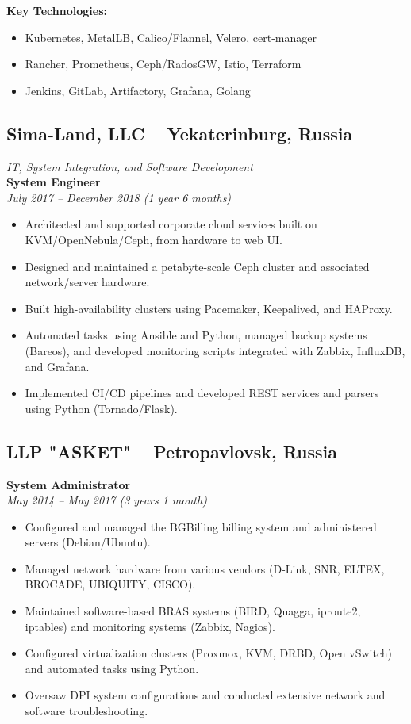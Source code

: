 \documentclass[12pt,a4paper]{article}
\begin{document}
\textbf{Key Technologies:}
\begin{itemize}
    \item Kubernetes, MetalLB, Calico/Flannel, Velero, cert-manager
    \item Rancher, Prometheus, Ceph/RadosGW, Istio, Terraform
    \item Jenkins, GitLab, Artifactory, Grafana, Golang
\end{itemize}

\subsection*{Sima-Land, LLC – Yekaterinburg, Russia}
\textit{IT, System Integration, and Software Development}\\
\textbf{System Engineer}\\
\textit{July 2017 – December 2018 (1 year 6 months)}
\begin{itemize}
    \item Architected and supported corporate cloud services built on KVM/OpenNebula/Ceph, from hardware to web UI.
    \item Designed and maintained a petabyte-scale Ceph cluster and associated network/server hardware.
    \item Built high-availability clusters using Pacemaker, Keepalived, and HAProxy.
    \item Automated tasks using Ansible and Python, managed backup systems (Bareos), and developed monitoring scripts integrated with Zabbix, InfluxDB, and Grafana.
    \item Implemented CI/CD pipelines and developed REST services and parsers using Python (Tornado/Flask).
\end{itemize}

\subsection*{LLP "ASKET" – Petropavlovsk, Russia}
\textbf{System Administrator}\\
\textit{May 2014 – May 2017 (3 years 1 month)}
\begin{itemize}
    \item Configured and managed the BGBilling billing system and administered servers (Debian/Ubuntu).
    \item Managed network hardware from various vendors (D-Link, SNR, ELTEX, BROCADE, UBIQUITY, CISCO).
    \item Maintained software-based BRAS systems (BIRD, Quagga, iproute2, iptables) and monitoring systems (Zabbix, Nagios).
    \item Configured virtualization clusters (Proxmox, KVM, DRBD, Open vSwitch) and automated tasks using Python.
    \item Oversaw DPI system configurations and conducted extensive network and software troubleshooting.
\end{itemize}
\end{document}
